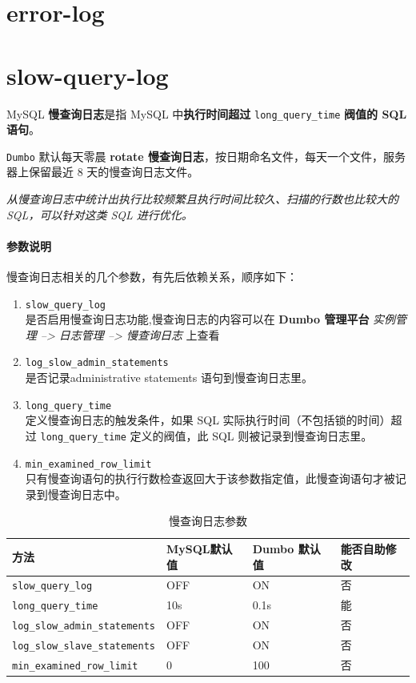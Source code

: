 \documentclass[UTF8,a4paper,12pt]{ctexbook}
\begin{document}
	
	
	\section{error-log}
	
	
	\section{slow-query-log}
		MySQL \textbf{慢查询日志}是指 MySQL 中\textbf{执行时间超过} \verb|long_query_time| \textbf{阀值的 SQL 语句}。
		
		\verb|Dumbo| 默认每天零晨 \textbf{rotate 慢查询日志}，按日期命名文件，每天一个文件，服务器上保留最近 8 天的慢查询日志文件。
		
		\textit{从慢查询日志中统计出执行比较频繁且执行时间比较久、扫描的行数也比较大的 SQL，可以针对这类 SQL 进行优化。}
	
		\paragraph{参数说明}
			慢查询日志相关的几个参数，有先后依赖关系，顺序如下：
			\begin{enumerate}[itemindent = 2em, itemsep = 0pt,partopsep=0pt]
				\item \verb|slow_query_log| \\ 是否启用慢查询日志功能,慢查询日志的内容可以在 \textbf{Dumbo 管理平台} \textit{实例管理 --> 日志管理 --> 慢查询日志} 上查看
				\item \verb|log_slow_admin_statements| \\ 是否记录administrative statements 语句到慢查询日志里。
				\item \verb|long_query_time| \\ 定义慢查询日志的触发条件，如果 SQL 实际执行时间（不包括锁的时间）超过 \verb|long_query_time| 定义的阀值，此 SQL 则被记录到慢查询日志里。
				\item \verb|min_examined_row_limit| \\ 只有慢查询语句的执行行数检查返回大于该参数指定值，此慢查询语句才被记录到慢查询日志中。
			\end{enumerate}
			
			\begin{table}[H]
				\centering
				\caption{慢查询日志参数}
				\begin{tabular}{p{6cm}<{\centering}|p{3cm}<{\centering}|p{3cm}<{\centering}|p{3cm}<{\centering}}
					\hline
						方法 &  MySQL默认值 &  Dumbo 默认值 & 能否自助修改\\
					\hline
				 \verb|slow_query_log| & OFF & ON &  否 \\
				 \verb|long_query_time| & 10s & 0.1s & 能 \\
				 \verb|log_slow_admin_statements| & OFF & ON & 否 \\
				 \verb|log_slow_slave_statements| & OFF & ON &否\\
				 \verb|min_examined_row_limit| & 0& 100 & 否 \\
					\hline
				\end{tabular}					
			\end{table}
			
\end{document}
